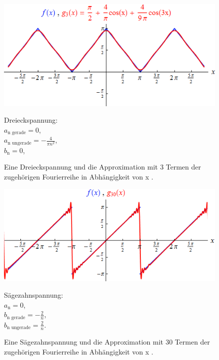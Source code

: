 \begin{figure}[H]
\hspace{73pt}
\begin{minipage}[t]{6cm}
\vspace{0pt}
\centering
\includegraphics[scale=0.5]{vorb2.png}
\caption{Eine Dreieckspannung und die Approximation mit 3 Termen der zugehörigen Fourierreihe in Abhängigkeit von x \cite{sample2}.}
\label{fig:vorb2}
\end{minipage}
\hfill
\hspace{73pt}
\begin{minipage}[t]{6cm}
\vspace{0pt}
Dreieckspannung: \\
$a_\text{n gerade} = 0$, \\
$a_\text{n ungerade} = - \frac{4}{\pi n^{2}}$, \\
$b_\text{n} = 0$,
\end{minipage}
\end{figure}

\begin{figure}[H]
\hspace{73pt}
\begin{minipage}[t]{6cm}
\vspace{0pt}
\centering
\includegraphics[scale=0.5]{vorb3.png}
\caption{Eine Sägezahnspannung und die Approximation mit 30 Termen der zugehörigen Fourierreihe in Abhängigkeit von x \cite{sample2}.}
\label{fig:vorb3}
\end{minipage}
\hfill
\hspace{73pt}
\begin{minipage}[t]{6cm}
\vspace{0pt}
Sägezahnspannung: \\
$a_\text{n} = 0$, \\
$b_\text{n gerade} = - \frac{2}{n}$, \\
$b_\text{n ungerade} = \frac{2}{n}$.
\end{minipage}
\end{figure}

